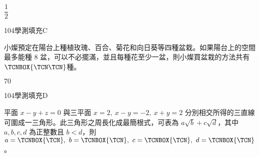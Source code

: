 \begin{QUESTIONS}
\begin{QUESTION}
        \begin{QANS}
            $\dfrac{1}{2}$
        \end{QANS}
        \begin{QSOLLIST}
        \end{QSOLLIST}
        \begin{QEMPTYSPACE}
        \end{QEMPTYSPACE}
    \end{QUESTION}
    \begin{QUESTION}
        \begin{ExamInfo}{104}{學測}{填充}{C}
        \end{ExamInfo}
        \begin{ExamAnsRateInfo}{21}{49}{11}{3}
        \end{ExamAnsRateInfo}
        \begin{QBODY}
            小燦預定在陽台上種植玫瑰、百合、菊花和向日葵等四種盆栽。如果陽台上的空間最多能種 $8$ 盆，可以不必擺滿，並且每種花至少一盆，則小燦買盆栽的方法共有$\TCNBOX{\TCN\TCN}$種。
        \end{QBODY}
        \begin{QFROMS}
        \end{QFROMS}
        \begin{QTAGS}\end{QTAGS}
        \begin{QANS}
            $70$
        \end{QANS}
        \begin{QSOLLIST}
        \end{QSOLLIST}
        \begin{QEMPTYSPACE}
        \end{QEMPTYSPACE}
    \end{QUESTION}
    \begin{QUESTION}
        \begin{ExamInfo}{104}{學測}{填充}{D}
        \end{ExamInfo}
        \begin{ExamAnsRateInfo}{13}{36}{3}{0}
        \end{ExamAnsRateInfo}
        \begin{QBODY}
            平面 $x-y+z=0$ 與三平面 $x=2,\ x-y=-2,\ x+y=2$ 分別相交所得的三直線可圍成一三角形。此三角形之周長化成最簡根式，可表為 $a\sqrt{b}+c\sqrt{d}$，其中 $a,b,c,d$ 為正整數且 $b<d$，則 $a=\TCNBOX{\TCN },\ b=\TCNBOX{\TCN },\ c=\TCNBOX{\TCN },\ d=\TCNBOX{\TCN }$。
        \end{QBODY}

\end{QUESTION}
\end{QUESTIONS}
